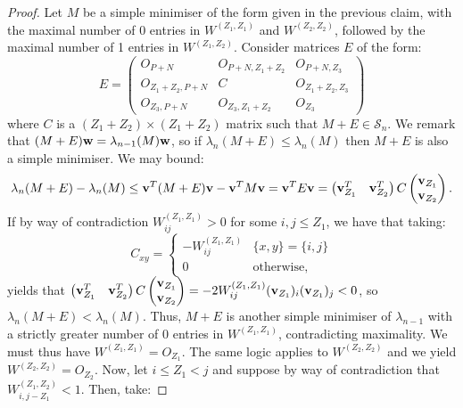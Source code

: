 \documentclass[12pt]{article}
\begin{document}
\begin{proof} 
Let $M$ be a simple minimiser of the form given in the previous claim, with the maximal number of 0 entries in $W^{(Z_1,Z_1)}$ and $W^{(Z_2,Z_2)}$, followed by the maximal number of 1 entries in $W^{(Z_1,Z_2)}$. Consider matrices $E$ of the form:
\begin{equation*}
    E = \begin{pmatrix}
            O_{P+N} & O_{P+N,Z_1+Z_2} & O_{P+N,Z_3} \\ O_{Z_1+Z_2,P+N} & C & O_{Z_1+Z_2,Z_3} \\ O_{Z_3,P+N} & O_{Z_3,Z_1+Z_2} & O_{Z_3}\end{pmatrix}
\end{equation*}
where $C$ is a $(Z_1+Z_2)\times (Z_1+Z_2)$ matrix such that $M+E\in \mathcal{S}_n$. We remark that $(M+E)\bold{w} = \lambda_{n-1}(M)\bold{w}$, so if $\lambda_{n}(M+E)\le \lambda_{n}(M)$ then $M+E$ is also a simple minimiser. We may bound:
\begin{equation*}
    \lambda_n(M+E) - \lambda_{n}(M) \le \bold{v}^{T}(M+E)\bold{v} - \bold{v}^{T}M\bold{v} = \bold{v}^{T}E\bold{v} = \begin{pmatrix}\bold{v}_{Z_1}^T & \bold{v}_{Z_2}^T\end{pmatrix}C\begin{pmatrix}\bold{v}_{Z_1} \\ \bold{v}_{Z_2}\end{pmatrix}.
\end{equation*}
If by way of contradiction $W^{(Z_1,Z_1)}_{ij}>0$ for some $i,j\le Z_1$, we have that taking:
\begin{equation*}
    C_{xy} = \begin{cases}
        -W^{(Z_1,Z_1)}_{ij} & \{x,y\} = \{i,j\}\\ 0 & \text{otherwise},
    \end{cases}
\end{equation*}
yields that $\begin{pmatrix}\bold{v}_{Z_1}^T&  \bold{v}_{Z_2}^{T}\end{pmatrix} C\begin{pmatrix}\bold{v}_{Z_1} \\ \bold{v}_{Z_2}\end{pmatrix} = -2W^{(Z_1,Z_1)}_{ij}(\bold{v}_{Z_1})_i(\bold{v}_{Z_1})_j<0$, so $\lambda_{n}(M+E) < \lambda_{n}(M)$. Thus, $M+E$ is another simple minimiser of $\lambda_{n-1}$ with a strictly greater number of 0 entries in $W^{(Z_1,Z_1)}$, contradicting maximality. We must thus have $W^{(Z_1,Z_1)} = O_{Z_1}$. The same logic applies to $W^{(Z_2,Z_2)}$ and we yield $W^{(Z_2,Z_2)} = O_{Z_2}$. Now, let $i\le Z_1 < j$ and suppose by way of contradiction that $W^{(Z_1,Z_2)}_{i,j-Z_1} < 1$. Then, take:

\end{proof}
\end{document}
